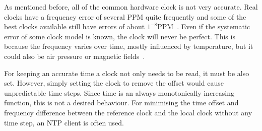 As mentioned before, all of the common hardware clock is not very accurate.
Real clocks have a frequency error of several PPM quite frequently
and some of the best clocks available still have errors of about $1^{-8}$PPM~\cite{ntp-faq}.
Even if the systematic error of some clock model is known, the clock will never be perfect.
This is because the frequency varies over time, mostly influenced by temperature,
but it could also be air pressure or magnetic fields~\cite{ntp-faq}.

For keeping an accurate time a clock not only needs to be read, it must be also set.
However, simply setting the clock to remove the offset would cause unpredictable time steps.
Since time is an always monotonically increasing function, this is not a desired behaviour.
For minimising the time offset and frequency difference between
the reference clock and the local clock without any time step,
an NTP client is often used.
